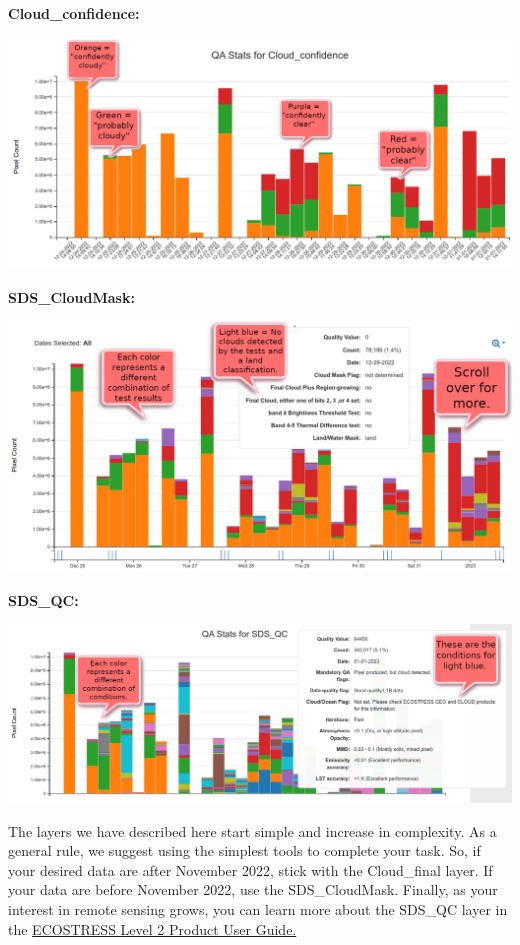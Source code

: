 \documentclass[oneside,a4paper,11pt,explicit]{book}
\begin{document}
	\textbf{Cloud\_confidence:}
	\centerline{\includegraphics[width=.85\textwidth]{Cloud_confidence.png}}
	
	\textbf{SDS\_CloudMask:}
	\centerline{\includegraphics[width=.85\textwidth]{SDS_CloudMask_Layer.png}}
	
	\clearpage
	
	\textbf{SDS\_QC:}
	\centerline{\includegraphics[width=\textwidth]{SDS_QC_Layer.png}}
	
	\vspace{.5em}
	
	The layers we have described here start simple and increase in complexity. As a general rule, we suggest using the simplest tools to complete your task. So, if your desired data are after November 2022, stick with the Cloud\_final layer. If your data are before November 2022, use the SDS\_CloudMask. Finally, as your interest in remote sensing grows, you can learn more about the SDS\_QC layer in the \href{https://lpdaac.usgs.gov/documents/423/ECO2_User_Guide_V1.pdf}{ECOSTRESS Level 2 Product User Guide.}
\end{document}
